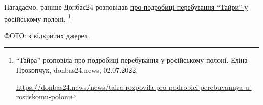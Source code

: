 Нагадаємо, раніше Донбас24 розповідав \href{https://donbas24.news/news/taira-rozpovila-pro-podrobici-perebuvannya-u-rosiiskomu-poloni}{%
про подробиці перебування \enquote{Тайри} у російському полоні}.%
\footnote{\enquote{Тайра} розповіла про подробиці перебування у російському полоні, Еліна Прокопчук, donbas24.news, 02.07.2022, %
\par\url{https://donbas24.news/news/taira-rozpovila-pro-podrobici-perebuvannya-u-rosiiskomu-poloni}}

ФОТО: з відкритих джерел.

